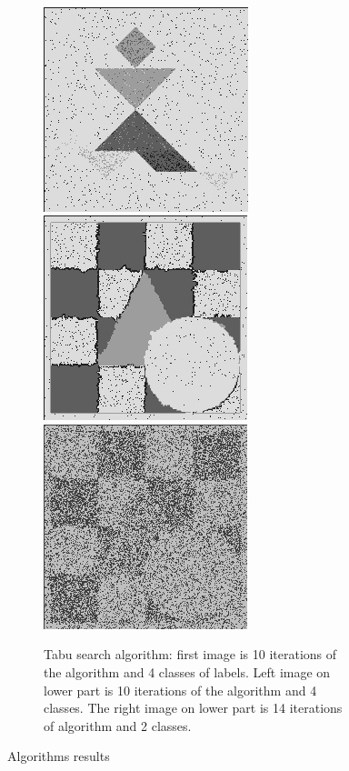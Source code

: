 \documentclass[twoside,10.5pt]{article}
\begin{document}
\begin{figure}[t!]
    ~
    \begin{subfigure}[b]{0.45\textwidth}
        \centering
        \includegraphics[width=.45\linewidth]{tangram_10.jpg}
        \\[\baselineskip]%
        \includegraphics[width=.45\linewidth]{chess_circle_triangle_10.jpg}
        \includegraphics[width=.45\linewidth]{chess_circle_triangle_2_14.jpg}
        \caption{Tabu search algorithm: first image is 10 iterations of the algorithm and 4 classes of labels. Left image on lower part is 10 iterations of the algorithm and 4 classes. The right image on lower part is 14 iterations of algorithm and 2 classes.}
    \end{subfigure}
\caption{Algorithms results}
\label{fig:resultsAlgorithms}
\end{figure}
\end{document}
